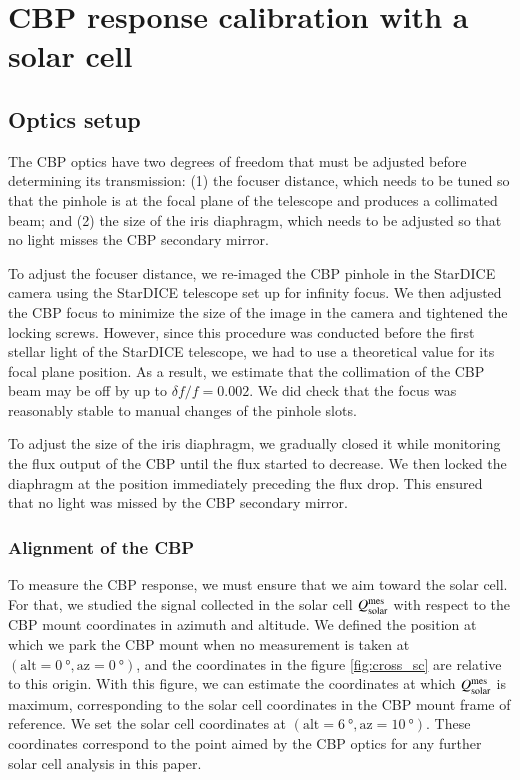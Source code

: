 \section{CBP response calibration with a solar cell}
\label{sec:rcbp}

\subsection{Optics setup}

The CBP optics have two degrees of freedom that must be adjusted
before determining its transmission: (1) the focuser distance, which
needs to be tuned so that the pinhole is at the focal plane of the
telescope and produces a collimated beam; and (2) the size of the iris
diaphragm, which needs to be adjusted so that no light misses the CBP
secondary mirror.

To adjust the focuser distance, we re-imaged the CBP pinhole in the
StarDICE camera using the StarDICE telescope set up for infinity
focus. We then adjusted the CBP focus to minimize the size of the
image in the camera and tightened the locking screws. However, since
this procedure was conducted before the first stellar light of the
StarDICE telescope, we had to use a theoretical value for its focal
plane position. As a result, we estimate that the collimation of the
CBP beam may be off by up to $\delta f / f = 0.002$. We did check that
the focus was reasonably stable to manual changes of the pinhole
slots.

To adjust the size of the iris diaphragm, we gradually closed it while
monitoring the flux output of the CBP until the flux started to
decrease. We then locked the diaphragm at the position immediately
preceding the flux drop. This ensured that no light was missed by the
CBP secondary mirror.

\subsubsection{Alignment of the CBP}

To measure the CBP response, we must ensure that we aim toward the solar cell. For that, we studied the signal collected in the solar cell $Q_{\mathrm{solar}}^{\mathrm{mes}}$ with respect to the CBP mount coordinates in azimuth and altitude. We defined the position at which we park the CBP mount when no measurement is taken at $(\mathrm{alt} = \SI{0}{\degree}, \mathrm{az} = \SI{0}{\degree})$, and the coordinates in the figure \ref{fig:cross_sc} are relative to this origin. With this figure, we can estimate the coordinates at which $Q_{\mathrm{solar}}^{\mathrm{mes}}$ is maximum, corresponding to the solar cell coordinates in the CBP mount frame of reference. We set the solar cell coordinates at $(\mathrm{alt} = \SI{6}{\degree}, \mathrm{az} = \SI{10}{\degree})$. These coordinates correspond to the point aimed by the CBP optics for any further solar cell analysis in this paper.


